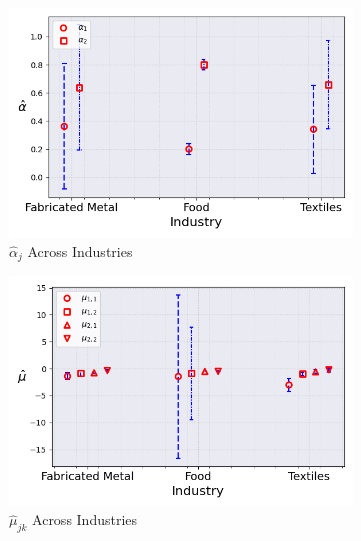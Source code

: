\documentclass{article}
\begin{document}
\begin{figure}[ht!]
    \centering 
    \caption{Stationary Mixture Model with $\log K$, Import and CIIU Across Industries ($M_0 = 2$)}
    \begin{subfigure}[t]{0.32\textwidth}
        \centering
        \includegraphics[width=\textwidth]{figure/stationary_mixture_kmshare_ciiu_alpha_across_industries_m2.png}
        \caption{$\hat\alpha_j$ Across Industries}
    \end{subfigure}
    \begin{subfigure}[t]{0.32\textwidth}
        \centering
        \includegraphics[width=\textwidth]{figure/stationary_mixture_kmshare_ciiu_mu_across_industries_m2.png}
        \caption{$\hat\mu_{jk}$ Across Industries}
    \end{subfigure}
    \begin{subfigure}[t]{0.32\textwidth}

\end{subfigure}
\end{figure}
\end{document}
